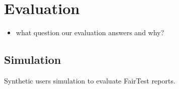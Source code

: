 \section{Evaluation}

\begin{itemize}
  \item what question our evaluation answers and why?
\end{itemize}

\subsection{Simulation}
Synthetic users simulation to evaluate FairTest reports.
